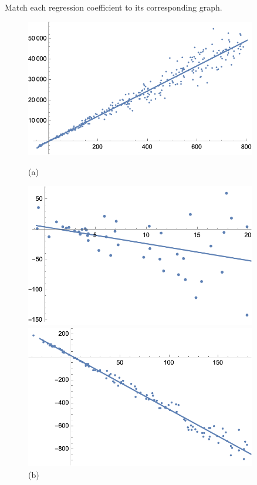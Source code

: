 \documentclass[11pt,letterpaper]{article}
\begin{document}
 Match each regression coefficient to its corresponding graph. 
	\begin{figure}[!ht]
	\centering
	\begin{minipage}{0.45\textwidth}
	   \centering
	   \includegraphics[width=0.9\textwidth]{reg4.png}
	   \caption*{(a)}
	\end{minipage}\hfill
	\begin{minipage}{0.45\textwidth}
	   \centering
	   \includegraphics[width=0.9\textwidth]{reg1.png}
	   \caption*{(b)}
	\end{minipage}
	\begin{minipage}{0.45\textwidth}
	   \centering
	   \includegraphics[width=0.9\textwidth]{reg2.png}

\end{minipage}
\end{figure}
\end{document}
